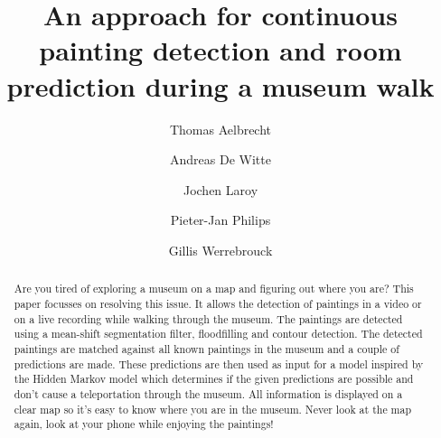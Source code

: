 \documentclass[runningheads]{llncs}
\begin{document}
\title{An approach for continuous painting detection and room prediction during a museum walk}
%
%
\author{
    Thomas Aelbrecht \and
    Andreas De Witte \and
    Jochen Laroy \and
    Pieter-Jan Philips \and
    Gillis Werrebrouck
}


%
%
\maketitle              %
%
\begin{abstract}

Are you tired of exploring a museum on a map and figuring out where you are? This paper focusses on resolving this issue. It allows the detection of paintings in a video or on a live recording while walking through the museum. The paintings are detected using a mean-shift segmentation filter, floodfilling and contour detection. The detected paintings are matched against all known paintings in the museum and a couple of predictions are made. These predictions are then used as input for a model inspired by the Hidden Markov model which determines if the given predictions are possible and don't cause a teleportation through the museum. All information is displayed on a clear map so it's easy to know where you are in the museum. Never look at the map again, look at your phone while enjoying the paintings!

\end{abstract}
%








%
%
%


\end{document}
